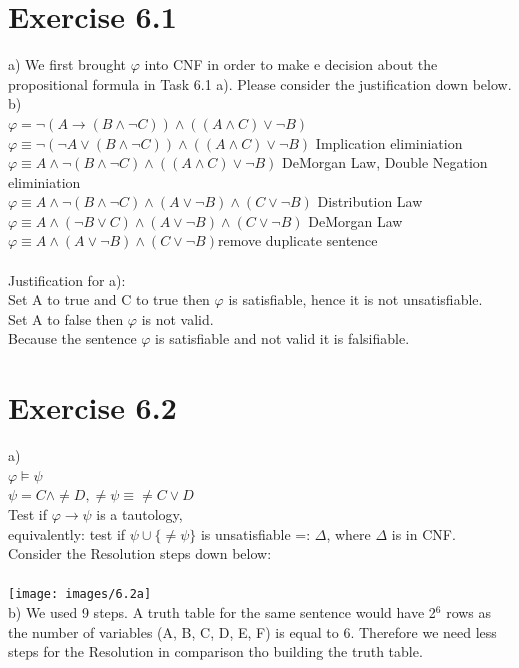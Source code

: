 \documentclass[12pt]{article}
\begin{document}
\section*{Exercise 6.1}
a) We first brought $\varphi$ into CNF in order to make e decision about the propositional formula in Task 6.1 a). Please consider the justification down below.\\
b) \\
$\varphi = \lnot (A \to (B \land \lnot C)) \land ((A \land C ) \lor \lnot B)$\\
$\varphi \equiv \lnot (\lnot A \lor (B \land \lnot C)) \land ((A \land C) \lor \lnot B)$ \qquad Implication eliminiation\\
$\varphi \equiv A \land \lnot (B \land \lnot C) \land ((A \land C) \lor \lnot B)$ \qquad DeMorgan Law, Double Negation eliminiation\\
$\varphi \equiv A \land \lnot (B \land \lnot C) \land (A \lor \lnot B) \land (C \lor \lnot B)$ \qquad Distribution Law\\
$\varphi \equiv A \land (\lnot B \lor C) \land (A \lor \lnot B) \land (C \lor \lnot B)$ \qquad DeMorgan Law\\
$\varphi \equiv A \land (A \lor \lnot B) \land (C \lor \lnot B)$\qquad remove duplicate sentence\\ \\
Justification for a):\\
Set A to true and C to true then $\varphi$ is satisfiable, hence it is not unsatisfiable.\\
Set A to false then $\varphi$ is not valid.\\
Because the sentence $\varphi$ is satisfiable and not valid it is falsifiable.


\section*{Exercise 6.2}
a)\\
$\varphi \vDash \psi$\\
$\psi = C \land \neq D, \neq \psi \equiv \neq C \lor D$\\
Test if $\varphi \to \psi$ is a tautology,\\
equivalently: test if $\psi \cup \{\neq \psi \}$ is unsatisfiable =: $\Delta$, where $\Delta$ is in CNF.\\
Consider the Resolution steps down below:\\ \\
\texttt{[image: images/6.2a]}\\
b) We used 9 steps. A truth table for the same sentence would have 2$^6$ rows as the number of variables (A, B, C, D, E, F) is equal to 6. Therefore we need less steps for the Resolution in comparison tho building the truth table.\\
\end{document}

